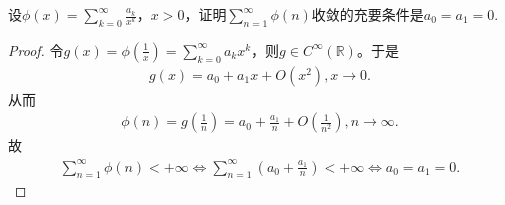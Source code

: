 \documentclass[../../main.tex]{subfiles}
\begin{document}
\begin{example}
设\(\phi(x) = \sum_{k = 0}^{\infty} \frac{a_k}{x^k}\)，\(x > 0\)，证明\(\sum_{n = 1}^{\infty} \phi(n)\)收敛的充要条件是\(a_0 = a_1 = 0\).
\end{example}
\begin{proof}
令\(g\left( x \right) =\phi \left( \frac{1}{x} \right) =\sum_{k=0}^{\infty}{a_kx^k}\)，则\(g\in C^{\infty}\left( \mathbb{R} \right)\)。于是
\begin{align*}
g\left( x \right) =a_0+a_1x+O\left( x^2 \right) ,x\rightarrow 0.
\end{align*}
从而
\begin{align*}
\phi \left( n \right) =g\left( \frac{1}{n} \right) =a_0+\frac{a_1}{n}+O\left( \frac{1}{n^2} \right) ,n\rightarrow \infty .
\end{align*}
故
\begin{align*}
\sum_{n=1}^{\infty}{\phi \left( n \right)}<+\infty \Longleftrightarrow \sum_{n=1}^{\infty}{\left( a_0+\frac{a_1}{n} \right)}<+\infty \Longleftrightarrow a_0=a_1=0.
\end{align*}
\end{proof}
\end{document}
